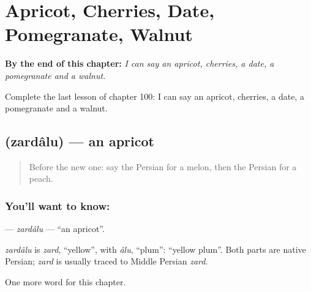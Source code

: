 
\chapter{Apricot, Cherries, Date, Pomegranate, Walnut}
\label{ch:fa-apricot-cherries-date-pomegranate-walnut}

\begin{chapteropening}
\textbf{By the end of this chapter:} \emph{I can say an apricot, cherries, a date, a pomegranate and a walnut.}

Complete the last lesson of chapter 100: I can say an apricot, cherries, a date, a pomegranate and a walnut.
\end{chapteropening}

\section[\texorpdfstring{\fa{زردآلو} (zardâlu)}{زردآلو (zardâlu)}]{ (zardâlu) — an apricot}

\label{lesson:FA-C100-zardalu}



\begin{quote}
Before the new one: say the Persian for a melon, then the Persian for a peach.
\end{quote}

\subsection*{You'll want to know: }
\textbf{} — \emph{zardâlu} — \textquotedblleft{}an apricot\textquotedblright{}.

\begin{cousinweb}
\emph{zardâlu} is \emph{zard}, \textquotedblleft{}yellow\textquotedblright{}, with \emph{âlu}, \textquotedblleft{}plum\textquotedblright{}: \textquotedblleft{}yellow plum\textquotedblright{}. Both parts are native Persian; \emph{zard} is usually traced to Middle Persian \emph{zard}.
\end{cousinweb}

\begin{grammarlens}[title={What you've built}]
One more word for this chapter.
\end{grammarlens}

